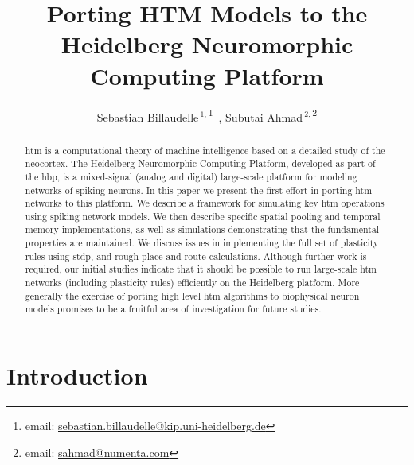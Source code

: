 \documentclass{reporter}
\begin{document}

\title[Porting HTM Models to the Heidelberg Neuromorphic Computing Platform]{Porting HTM Models to the Heidelberg Neuromorphic Computing Platform}
\author[Billaudelle et al.]{Sebastian Billaudelle\,$^{1,}$\footnote{email: \href{mailto:sebastian.billaudelle@kip.uni-heidelberg.de}{sebastian.billaudelle@kip.uni-heidelberg.de}}\ , Subutai Ahmad\,$^{2,}$\footnote{email: \href{mailto:sahmad@numenta.com}{sahmad@numenta.com}}}
\address{$^{1}$Kirchhoff-Institute for Physics, Heidelberg, Germany\\
$^{2}$Numenta, Inc., Redwood City, CA}



\maketitle

\begin{abstract}

\gls{htm} is a computational theory of machine
intelligence based on a detailed study of the neocortex. The Heidelberg
Neuromorphic Computing Platform, developed as part of the \gls{hbp},
is a mixed-signal (analog and digital) large-scale platform for
modeling networks of spiking neurons. In this paper we present the first effort
in porting \gls{htm} networks to this platform.  We describe a framework for
simulating key \gls{htm} operations  using spiking network models. We then describe
specific spatial pooling and temporal memory implementations, as well as
simulations demonstrating that the fundamental properties are maintained. We
discuss issues in implementing the full set of plasticity rules using \gls{stdp}, and
rough place and route calculations. Although further work is required, our
initial studies indicate that it should be  possible to run large-scale \gls{htm}
networks (including plasticity rules) efficiently on the Heidelberg platform.
More generally the exercise of porting high level \gls{htm} algorithms to biophysical
neuron models promises to be a fruitful area of investigation for future
studies.

\end{abstract}

\glsresetall

\section{Introduction}

\end{document}
